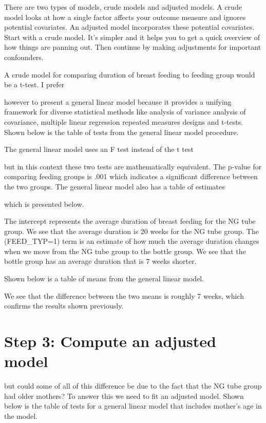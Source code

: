 \documentclass[
  letterpaper,
  DIV=11,
  numbers=noendperiod]{scrreprt}
\begin{document}
There are two types of models, crude models and adjusted models. A crude
model looks at how a single factor affects your outcome measure and
ignores potential covariates. An adjusted model incorporates these
potential covariates. Start with a crude model. It's simpler and it
helps you to get a quick overview of how things are panning out. Then
continue by making adjustments for important confounders.

A crude model for comparing duration of breast feeding to feeding group
would be a t-test. I prefer

however to present a general linear model because it provides a unifying
framework for diverse statistical methods like analysis of variance
analysis of covariance, multiple linear regression repeated measures
designs and t-tests. Shown below is the table of tests from the general
linear model procedure.

The general linear model uses an F test instead of the t test

but in this context these two tests are mathematically equivalent. The
p-value for comparing feeding groups is .001 which indicates a
significant difference between the two groups. The general linear model
also has a table of estimates

which is presented below.

The intercept represents the average duration of breast feeding for the
NG tube group. We see that the average duration is 20 weeks for the NG
tube group. The (FEED\_TYP=1) term is an estimate of how much the
average duration changes when we move from the NG tube group to the
bottle group. We see that the bottle group has an average duration that
is 7 weeks shorter.

Shown below is a table of means from the general linear model.

We see that the difference between the two means is roughly 7 weeks,
which confirms the results shown previously.

\section{Step 3: Compute an adjusted
model}\label{step-3-compute-an-adjusted-model}

but could some of all of this difference be due to the fact that the NG
tube group had older mothers? To answer this we need to fit an adjusted
model. Shown below is the table of tests for a general linear model that
includes mother's age in the model.
\end{document}
